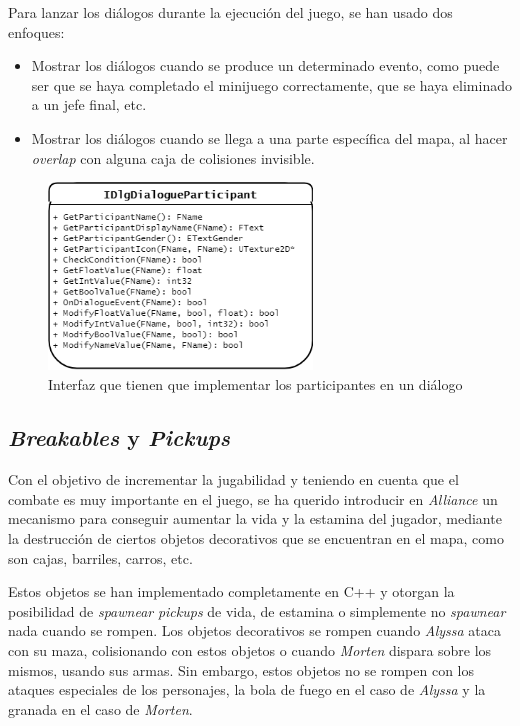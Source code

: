 Para lanzar los diálogos durante la ejecución del juego, se han usado dos enfoques:

\begin{itemize}
\item Mostrar los diálogos cuando se produce un determinado evento, como puede ser que se haya completado el minijuego correctamente, que se haya eliminado a un jefe final, etc.
\item Mostrar los diálogos cuando se llega a una parte específica del mapa, al hacer \textit{overlap} con alguna caja de colisiones invisible. 
\end{itemize}

\begin{figure}[H]
  \centering
  \includegraphics[width=7cm]{./images/IDlgParticipant.png}
  \caption{Interfaz que tienen que implementar los participantes en un diálogo}
  \label{Dialog}
\end{figure}

\subsection{\textit{Breakables} y \textit{Pickups}}

Con el objetivo de incrementar la jugabilidad y teniendo en cuenta que el combate es muy importante en el juego, se ha querido introducir en \textit{Alliance} un mecanismo para conseguir aumentar la vida y la estamina del jugador, mediante la destrucción de ciertos objetos decorativos que se encuentran en el mapa, como son cajas, barriles, carros, etc. 

Estos objetos se han implementado completamente en C++ y otorgan la posibilidad de \textit{spawnear} \textit{pickups} de vida, de estamina o simplemente no \textit{spawnear} nada cuando se rompen. Los objetos decorativos se rompen cuando \textit{Alyssa} ataca con su maza, colisionando con estos objetos o cuando \textit{Morten} dispara sobre los mismos, usando sus armas. Sin embargo, estos objetos no se rompen con los ataques especiales de los personajes, la bola de fuego en el caso de \textit{Alyssa} y la granada en el caso de \textit{Morten}. 

